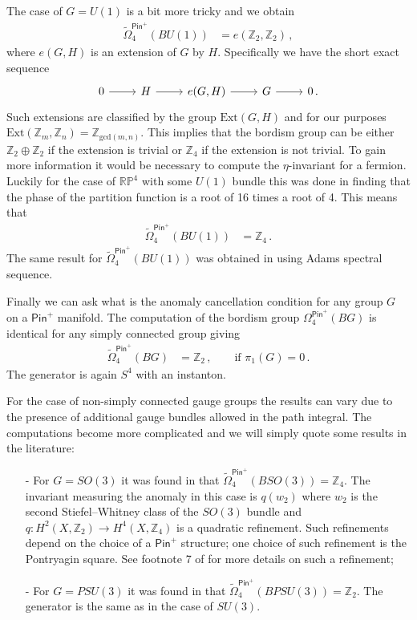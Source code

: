 \documentclass[12pt]{article}%
\numberwithin{equation}{section}
\newcommand{\al}[1]{\begin{align}#1\end{align}}
\renewcommand{\(}{\left(}
\renewcommand{\)}{\right)}
\renewcommand{\[}{\left[}
\renewcommand{\]}{\right]}
\begin{document}
The case of $G= U(1)$ is a bit more tricky and we obtain
%
\al{\widetilde \Omega^{\mathsf{Pin}^+}_4 (BU(1)) &= e(\mathbb Z_2,\mathbb Z_2)\,,
}
%
where $e(G,H)$ is an extension of $G$ by $H$. Specifically we have the short exact sequence
\begin{equation}
\begin{tikzcd}
 0 \arrow[r]& H \arrow[r]& e(G,H) \arrow[r]& G \arrow[r]& 0\,.
 \end{tikzcd}
\end{equation}
Such extensions are classified by the group $\text{Ext}(G,H)$ and for our purposes $\text{Ext}(\mathbb Z_m,\mathbb Z_n) = \mathbb Z_{\text{gcd}(m,n)}$. This implies that the bordism group can be either $\mathbb Z_2 \oplus \mathbb Z_2$ if the extension is trivial or $\mathbb Z_4$ if the extension is not trivial. To gain more information it would be necessary to compute the $\eta$-invariant for a fermion. Luckily for the case of $\mathbb{RP}^4$ with some $U(1)$ bundle this was done in \cite{Witten:2016cio} finding that the phase of the partition function is a root of 16 times a root of 4. This means that
%
\al{\widetilde \Omega^{\mathsf{Pin}^+}_4 (BU(1)) &= \mathbb Z_4\,.
}
%
The same result for $\widetilde \Omega^{\mathsf{Pin}^+}_4 (BU(1))$ was obtained in \cite{Davighi:2020kok} using Adams spectral sequence.


Finally we can ask what is the anomaly cancellation condition for any group $G$ on a $\mathsf {Pin}^+$ manifold. The computation of the bordism group $\Omega_4^{\mathsf{Pin}^+}(BG)$ is identical for any simply connected group giving
%
\al{ \widetilde \Omega^{\mathsf{Pin}^+}_4 (BG) &= \mathbb Z_2\,, \qquad \text{if } \pi_1(G) = 0\,.
}
%
The generator is again $S^4$ with an instanton.

For the case of non-simply connected gauge groups the results can vary due to the presence of additional gauge bundles allowed in the path integral. The computations become more complicated and we will simply quote some results in the literature:
\begin{itemize}
\item[-] For $G=SO(3)$ it was found in \cite{Wan:2018bns} that  $\widetilde \Omega_4^{\mathsf{Pin}^+}(BSO(3)) = \mathbb Z_4$. The invariant measuring the anomaly in this case is $q(w_2)$ where $w_2$ is the second Stiefel--Whitney class of the $SO(3)$ bundle and $q : H^2(X,\mathbb Z_2) \rightarrow H^4(X,\mathbb Z_4)$ is a quadratic refinement. Such refinements depend on the choice of a $\mathsf{Pin }^+$ structure; one choice of such refinement is the Pontryagin square. See footnote 7 of \cite{Wan:2018bns} for more details on such a refinement;
\item[-] For $G=PSU(3)$ it was found in \cite{Wan:2018bns} that $\widetilde \Omega_4^{\mathsf{Pin}^+}(BPSU(3)) = \mathbb Z_2$. The generator is the same as in the case of $SU(3)$.
\end{itemize}
\end{document}
